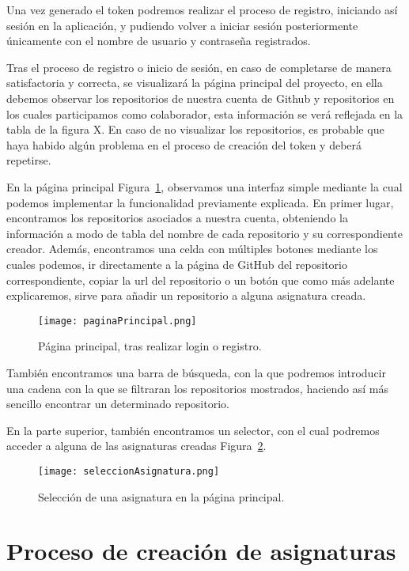 Una vez generado el token podremos realizar el proceso de registro, iniciando así sesión en la aplicación, y pudiendo volver a iniciar sesión posteriormente únicamente con el nombre de usuario y contraseña registrados.


Tras el proceso de registro o inicio de sesión, en caso de completarse de manera satisfactoria y correcta, se visualizará la página principal del proyecto, en ella debemos observar los repositorios de nuestra cuenta de Github y repositorios en los cuales participamos como colaborador, esta información se verá reflejada en la tabla de la figura X.
En caso de no visualizar los repositorios, es probable que haya habido algún problema en el proceso de creación del token y deberá repetirse.

En la página principal Figura~\ref{figure:mainPage}, observamos una interfaz simple mediante la cual podemos implementar la funcionalidad previamente explicada. En primer lugar, encontramos los repositorios asociados a nuestra cuenta, obteniendo la información a modo de tabla del nombre de cada repositorio y su correspondiente creador. Además, encontramos una celda con múltiples botones mediante los cuales podemos, ir directamente a la página de GitHub del repositorio correspondiente, copiar la url del repositorio  o un botón que como más adelante explicaremos, sirve para añadir un repositorio a alguna asignatura creada.

\begin{figure}[h!]
  \texttt{[image: paginaPrincipal.png]}
  \caption{Página principal, tras realizar login o registro.}
  \label{figure:mainPage}
\end{figure}

También encontramos una barra de búsqueda, con la que podremos introducir una cadena con la que se filtraran los repositorios mostrados, haciendo así más sencillo encontrar un determinado repositorio.

En la parte superior, también encontramos un selector, con el cual podremos acceder a alguna de las asignaturas creadas Figura~\ref{figure:mainPageSeleccion}.
\begin{figure}[h!]
  \texttt{[image: seleccionAsignatura.png]}
  \caption{Selección de una asignatura en la página principal.}
  \label{figure:mainPageSeleccion}
\end{figure}


\section{Proceso de creación de asignaturas}


